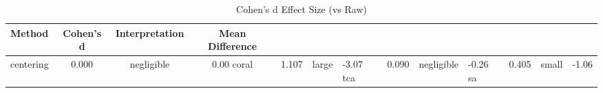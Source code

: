\begin{table}[htbp]
\centering
\caption{Cohen's d Effect Size (vs Raw)}
\label{tab:cohend}
\begin{tabular}{lccc}
\toprule
Method & Cohen's d & Interpretation & Mean Difference \\
\midrule
centering & 0.000 & negligible & 0.00%
coral & 1.107 & large & -3.07%
tca & 0.090 & negligible & -0.26%
sa & 0.405 & small & -1.06%
\bottomrule
\end{tabular}
\end{table}
